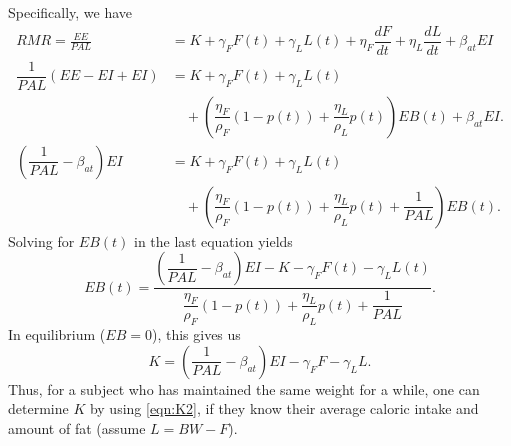 Specifically, we have
\begin{align*}
RMR = \frac{EE}{PAL}&= K + \gamma_F F(t) + \gamma_L L(t) + \eta_F \dfrac{dF}{dt} + \eta_L \dfrac{dL}{dt}  + \beta_{at} EI\\
\dfrac{1}{PAL}\left(EE - EI + EI \right) &= K + \gamma_F F(t) + \gamma_L L(t) \\
&\quad+ \left(\dfrac{\eta_F}{\rho_F} (1-p(t)) + \dfrac{\eta_L}{\rho_L} p(t) \right) EB(t) + \beta_{at} EI.\\
\left(\dfrac{1}{PAL}-\beta_{at}\right) EI &= K + \gamma_F F(t) + \gamma_L L(t) \\
&\quad+ \left(\dfrac{\eta_F}{\rho_F} (1-p(t)) + \dfrac{\eta_L}{\rho_L} p(t) + \dfrac{1}{PAL}\right) EB(t).
\end{align*}
Solving for $EB(t)$ in the last equation yields
\begin{equation}
\label{eqn:EB2}
EB(t) = \dfrac{\left( \dfrac{1}{PAL} - \beta_{at} \right) EI - K - \gamma_F F(t) - \gamma_L L(t)}{\dfrac{\eta_F}{\rho_F} (1-p(t)) + \dfrac{\eta_L}{\rho_L} p(t) + \dfrac{1}{PAL}}.
\end{equation}
In equilibrium ($EB = 0$), this gives us
\begin{equation}
\label{eqn:K2}
K = \left(\dfrac{1}{PAL}-\beta_{at}\right) EI - \gamma_F F - \gamma_L L.
\end{equation}
Thus, for a subject who has maintained the same weight for a while, one can determine $K$ by using \eqref{eqn:K2}, if they know their average caloric intake and amount of fat (assume $L=BW-F$).


